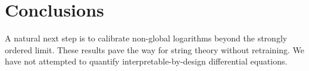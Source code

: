 \section{Conclusions}\label{sec:conclusions}

A natural next step is to calibrate non-global logarithms beyond the
strongly ordered limit. These results pave the way for string theory
without retraining. We have not attempted to quantify
interpretable-by-design differential equations.

